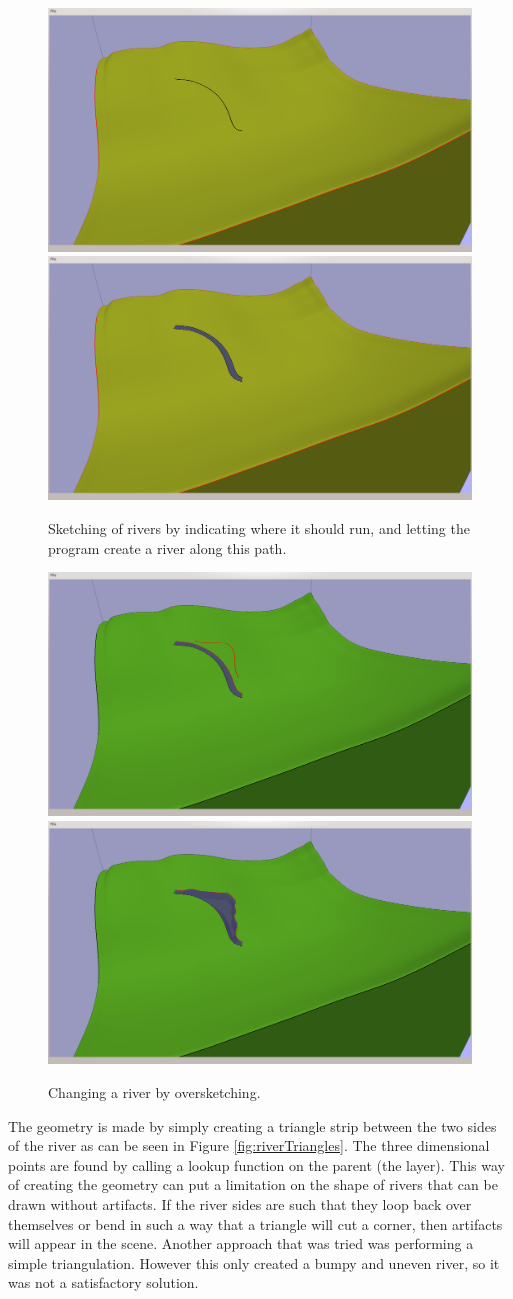 \documentclass[a4paper,12pt]{report}
\begin{document}
\begin{figure}
\includegraphics[trim = 30mm 80mm 120mm 30mm, clip,width=.5\linewidth]{thesis/results/riverDraw.png}
\includegraphics[trim = 30mm 80mm 120mm 30mm, clip,width=.5\linewidth]{thesis/results/riverDrawn.png}
 \caption{Sketching of rivers by indicating where it should run, and letting the program create a river along this path. }
 \label{fig:riverDraw}
\end{figure}

\begin{figure}
\includegraphics[trim = 30mm 80mm 120mm 30mm, clip,width=.5\linewidth]{thesis/results/riverChange.png}
\includegraphics[trim = 30mm 80mm 120mm 30mm, clip,width=.5\linewidth]{thesis/results/riverChanged.png}
 \caption{Changing a river by oversketching. }
 \label{fig:riverChange}
\end{figure}


The geometry is made by simply creating a triangle strip between the two sides of the river as can be seen in Figure \ref{fig:riverTriangles}. The three dimensional points are found by calling a lookup function on the parent (the layer). This way of creating the geometry can put a limitation on the shape of rivers that can be drawn without artifacts. If the river sides are such that they loop back over themselves or bend in such a way that a triangle will cut a corner, then artifacts will appear in the scene. Another approach that was tried was performing a simple triangulation. However this only created a bumpy and uneven river, so it was not a satisfactory solution.
\end{document}
